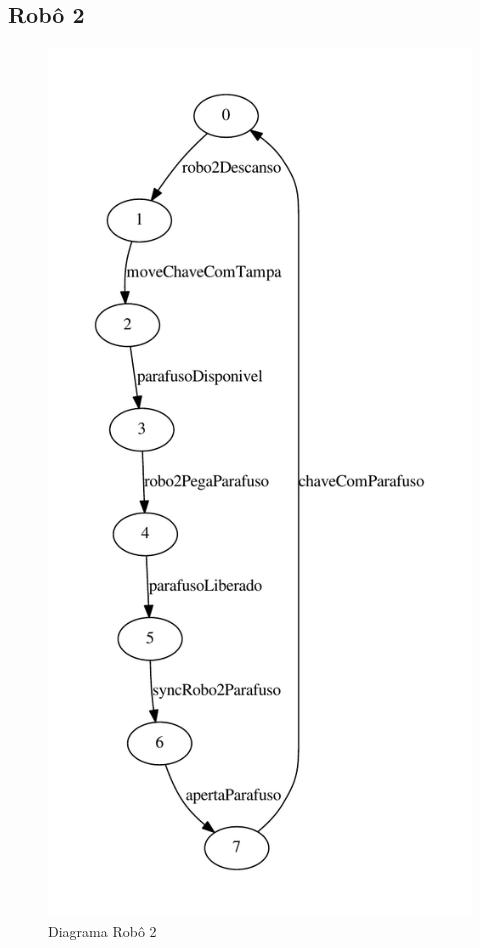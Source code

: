 \documentclass[a4paper,11pt,twocolumns]{article}
\begin{document}
\subsection{Robô 2}
\begin{figure}[H]
    \centering
    \includegraphics[height = 0.9\textheight]{./img/g_robo2.pdf}
    \caption{Diagrama Robô 2}
    \label{fig:g_robo2}
\end{figure}
\end{document}

